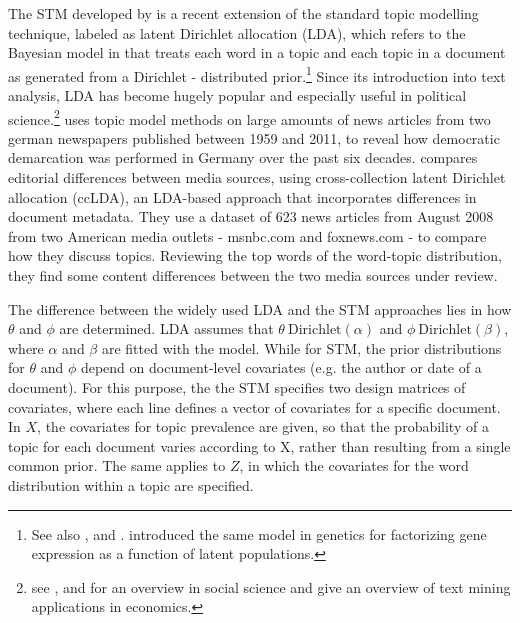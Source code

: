 \documentclass[12pt,a4paper,notitlepage]{article}
\begin{document}
The STM developed by \citet{roberts_model_2016} is a recent extension of the standard topic modelling technique, labeled as latent Dirichlet allocation (LDA), which refers to the Bayesian model in \citet{blei_latent_2003} that treats each word in a topic and each topic in a document as generated from a Dirichlet - distributed prior.\footnote{See also \citet{griffiths_probabilistic_2002}, \citet{griffiths_finding_2004} and \citet{hofmann_probabilistic_1999}. \citet{pritchard_inference_2000} introduced the same model in genetics for factorizing gene expression as a function of latent populations.} Since its introduction into text analysis, LDA has become hugely popular and especially useful in political science.\footnote{see \citet{blei_probabilistic_2012}, \citet{grimmer_text_2013} and \citet{wiedmann_text_2016} for an overview in social science and \citet{gentzkow_text_2017} give an overview of text mining applications in economics.} \citet{wiedmann_text_2016} uses topic model methods on large amounts of news articles from two german newspapers published between 1959 and 2011, to reveal how democratic demarcation was performed in Germany over the past six decades. \citet{paul_cross-collection_2009} compares editorial differences between media sources, using cross-collection latent Dirichlet allocation (ccLDA), an LDA-based approach that incorporates differences in document metadata. They use a dataset of 623 news articles from August 2008 from two American media outlets - msnbc.com and foxnews.com - to compare how they discuss topics. Reviewing the top words of the word-topic distribution, they find some content differences between the two media sources under review. 

The difference between the widely used LDA and the STM approaches lies in how $\theta$ and $\phi$ are determined. LDA assumes that $\theta ~ \text{Dirichlet}(\alpha)$ and $\phi ~ \text{Dirichlet}(\beta)$, where $\alpha$ and $\beta$ are fitted with the model. While for STM, the prior distributions for $\theta$ and $\phi$ depend on document-level covariates (e.g. the author or date of a document). For this purpose, the the STM specifies two design matrices of covariates, where each line defines a vector of covariates for a specific document.  In $X$, the covariates for topic prevalence are given, so that the probability of a topic for each document varies according to X, rather than resulting from a single common prior. The same applies to $Z$, in which the covariates for the word distribution within a topic are specified. 
\end{document}
